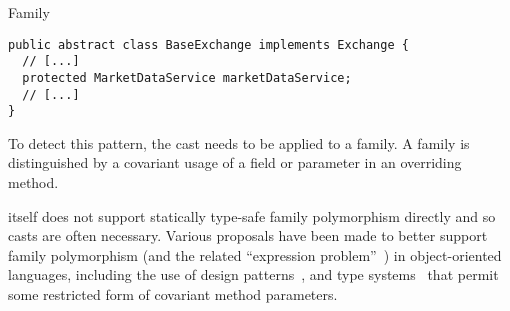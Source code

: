 \begin{pattern}{Family}
\begin{verbatim}
public abstract class BaseExchange implements Exchange {
  // [...]
  protected MarketDataService marketDataService;
  // [...]
}
\end{verbatim}

\detection{}
To detect this pattern, the cast needs to be applied to a family.
A family is distinguished by a covariant usage of a field or parameter in an overriding method.

\discussion{}
\java{} itself does not support statically type-safe family polymorphism directly
and so casts are often necessary. Various proposals have been made to better
support family polymorphism (and the related ``expression
problem''~\cite{Wadler98ExpressionProblem}) in object-oriented languages, including
the use of design patterns~\cite{WangOliveira16ExpressionProblem, oliveiraExtensibilityMasses2012, nystromPolyglotExtensibleCompiler2003},
and type systems~\cite{gbeta, scalaIndependentlyExtensible,
Myers2006SoftwareCW, olivieraDisjointIntersectionTypes,
funWithTypeFunctionsKiselyov09} that
permit some restricted form of covariant method parameters.

\end{pattern}

